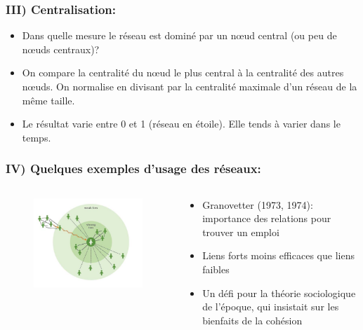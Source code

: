 \documentclass{beamer}
\begin{document}
\begin{frame}
    \frametitle{III) Centralisation:}
    \begin{itemize}
        \item Dans quelle mesure le réseau est dominé par un nœud central (ou peu de nœuds centraux)?
        \item On compare la centralité du nœud le plus central à la centralité des autres nœuds. On normalise en divisant par la centralité maximale d’un réseau de la même taille.
        \item Le résultat varie entre 0 et 1 (réseau en étoile). Elle tends à varier dans le temps.
    \end{itemize}
\end{frame}

\begin{frame}
    \frametitle{IV) Quelques exemples d'usage des réseaux:}
    \begin{columns}
        \begin{column}{0.5\textwidth}
            \begin{figure}
                \centering
                \includegraphics[width = \textwidth]{granovetter_getting_a_job.png}
            \end{figure}
        \end{column}
        \begin{column}{0.5\textwidth}
            \begin{itemize}
                \item Granovetter (1973, 1974): importance des relations pour trouver un emploi
                \item Liens forts moins efficaces que liens faibles
                \item Un défi pour la théorie sociologique de l’époque, qui insistait sur les bienfaits de la cohésion
            \end{itemize}
        \end{column}
    \end{columns}
\end{frame}
\end{document}
